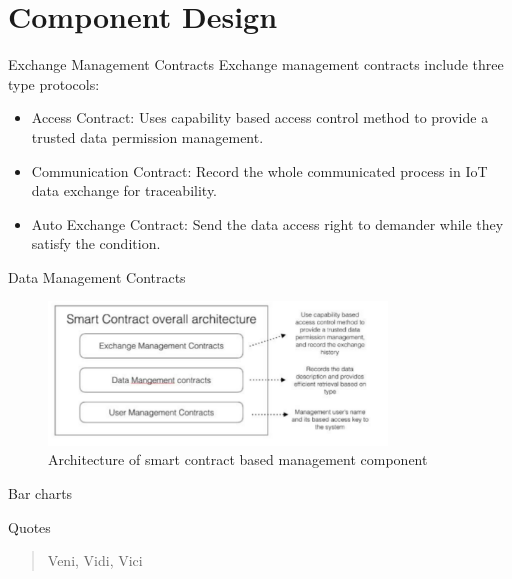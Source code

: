 \documentclass[10pt]{beamer}
\begin{document}
\section{Component Design}

\begin{frame}{Exchange Management Contracts}
	Exchange management contracts include three type protocols:
			\begin{itemize}
			\item Access Contract: Uses capability based access control method to provide a trusted data permission management. 
			\item Communication Contract: Record the whole communicated process in IoT data exchange for traceability.
			\item Auto Exchange Contract: Send the data access right to demander while they satisfy the condition.
			\end{itemize}
\end{frame}

\begin{frame}{Data Management Contracts}
	\begin{figure}  
	\includegraphics[width=9cm]{smatcontract_management}    
    \caption{Architecture of smart contract based management component}
    \end{figure}
\end{frame}
\begin{frame}{Bar charts}
  \begin{figure}
  \end{figure}
\end{frame}
\begin{frame}{Quotes}
  \begin{quote}
    Veni, Vidi, Vici
  \end{quote}
\end{frame}
\end{document}
